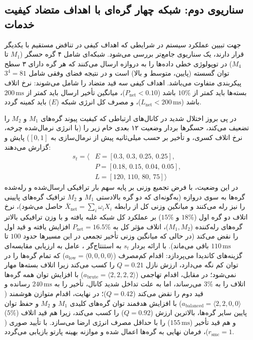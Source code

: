 \documentclass[oneside,openany,phd]{TMU-Thesis}
\begin{document}
\subsection{سناریوی دوم: شبکه چهار گره‌ای با اهداف متضاد کیفیت خدمات}
\label{subsec:app_scenario_4node}
جهت تبیین عملکرد سیستم در شرایطی که اهداف کیفی در تناقض مستقیم با یکدیگر قرار دارند، یک سناریوی جامع‌تر بررسی می‌شود. شبکه‌ای شامل ۴ گره حسگر ($M_1$ تا $M_4$) در توپولوژی خطی داده‌ها را به دروازه ارسال می‌کنند که هر گره دارای ۳ سطح توان گسسته (پایین، متوسط و بالا) است و در نتیجه فضای وفقی شامل $3^4 = 81$ پیکربندی متفاوت می‌باشد. اهداف کیفی سه قید متضاد را شامل می‌شوند: نرخ اتلاف بسته‌ها باید کمتر از $10\%$ باشد ($P_{\text{net}} < 0.10$)، میانگین تأخیر ارسال باید کمتر از $200\,\text{ms}$ باشد ($L_{\text{net}} < 200\,\text{ms}$)، و مصرف کل انرژی شبکه ($E$) باید کمینه گردد.

در پی بروز اختلال شدید در کانال‌های ارتباطی که کیفیت پیوند گره‌های $M_1$ و $M_2$ را تضعیف می‌کند، حسگرها بردار وضعیت ۱۲ بعدی خام زیر را (با انرژی نرمال‌شده چرخه، نرخ اتلاف کسری، و تأخیر بر حسب میلی‌ثانیه پیش از نرمال‌سازی به $[0, 1]$) پایش و گزارش می‌دهند:
\begin{equation}
\label{eq:app_state_vector_12d}
\begin{aligned}
s_t = \big\langle &E = [0.3,\, 0.3,\, 0.25,\, 0.25], \\
&P = [0.18,\, 0.15,\, 0.04,\, 0.05], \\
&L = [120,\, 110,\, 80,\, 75] \big\rangle
\end{aligned}
\end{equation}
در این وضعیت، با فرض تجمیع وزنی بر پایه سهم بار ترافیکی ارسال‌شده و رله‌شده گره‌ها به سوی دروازه (به‌گونه‌ای که دو گره بالادستی $M_1$ و $M_2$ ترافیک گره‌های پایینی را نیز رله می‌کنند و میانگین وزنی کل از رابطه $\bar{X}_{\text{net}} = \sum_i \omega_i X_i$ حاصل می‌شود)، نرخ اتلاف دو گره اول ($18\%$ و $15\%$) بر عملکرد کل شبکه غلبه یافته و با وزن ترافیکی بالاتر گره‌های رله‌کننده ($M_1, M_2$)، اتلاف مؤثر کل به $P_{\text{net}} = 16.5\%$ افزایش یافته و قید اول را نقض می‌کند (در حالی که میانگین وزنی تأخیر تجمعی در این مسیرها حدود $100$ تا $110\,\text{ms}$ باقی می‌ماند). با ارائه بردار $s_t$ به استنتاج‌گر ، عامل به ارزیابی مقایسه‌ای گزینه‌های کاندیدا می‌پردازد: اقدام کم‌مصرف ($a_{\text{low}} = \langle 0, 0, 0, 0 \rangle$) که تمام گره‌ها را در توان کم نگه می‌دارد، ارزش نازل $Q = 0.21$ را کسب می‌کند زیرا اتلاف بسته‌ها مهار نمی‌شود؛ در مقابل، اقدام تهاجمی ($a_{\text{brute}} = \langle 2, 2, 2, 2 \rangle$) با افزایش توان همه گره‌ها اتلاف را به $3\%$ می‌رساند، اما به علت تداخل شدید کانال، تأخیر را به $240\,\text{ms}$ رسانده و قید دوم را نقض می‌کند ($Q = 0.42$)؛ در نهایت، اقدام متوازن هوشمند ($a_{\text{balanced}} = \langle 2, 2, 0, 0 \rangle$) با افزایش هدفمند توان گره‌های کلیدی $M_1$ و $M_2$ و حفظ توان پایین سایر گره‌ها، بالاترین ارزش ($Q = 0.92$) را کسب می‌کند، زیرا هم قید اتلاف ($5\%$) و هم قید تأخیر ($155\,\text{ms}$) را با حداقل مصرف انرژی ارضا می‌سازد. با تأیید صوری  ($r_{\text{smc}}=1$)، فرمان نهایی به گره‌ها اعمال شده و موازنه بهینه پارتو بازیابی می‌گردد.
\end{document}
